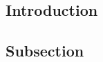 \begin{multicols}{2}
\section{Introduction}
\lipsum[1]\cite{Bowker1985}
\subsection{Subsection}
\lipsum[1]
\end{multicols}
